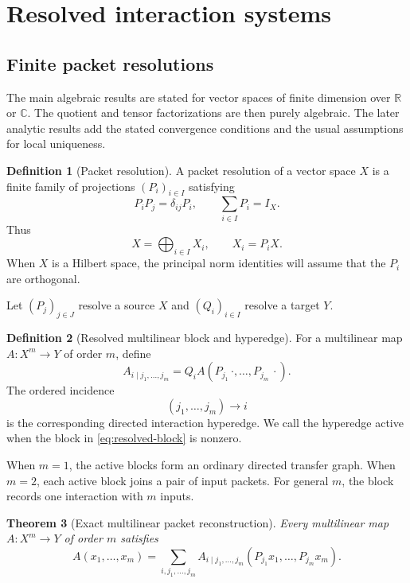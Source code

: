 \documentclass[11pt]{article}
\newtheorem{theorem}{Theorem}[section]
\theoremstyle{definition}
\newtheorem{definition}[theorem]{Definition}
\theoremstyle{remark}
\newcommand{\R}{\mathbb R}
\newcommand{\C}{\mathbb C}
\begin{document}
\section{Resolved interaction systems}\label{sec:resolved}

\subsection{Finite packet resolutions}
The main algebraic results are stated for vector spaces of finite dimension over $\R$ or $\C$.  The quotient and tensor factorizations are then purely algebraic.  The later analytic results add the stated convergence conditions and the usual assumptions for local uniqueness.

\begin{definition}[Packet resolution]\label{def:packet-resolution}
A packet resolution of a vector space $X$ is a finite family of projections $(P_i)_{i\in I}$ satisfying
\[
  P_iP_j=\delta_{ij}P_i,
  \qquad
  \sum_{i\in I}P_i=I_X.
\]
Thus
\[
  X=\bigoplus_{i\in I}X_i,
  \qquad X_i=P_iX.
\]
When $X$ is a Hilbert space, the principal norm identities will assume that the $P_i$ are orthogonal.
\end{definition}

Let $(P_j)_{j\in J}$ resolve a source $X$ and $(Q_i)_{i\in I}$ resolve a target $Y$.

\begin{definition}[Resolved multilinear block and hyperedge]\label{def:resolved-block}
For a multilinear map $A:X^m\to Y$ of order $m$, define
\begin{equation}\label{eq:resolved-block}
  A_{i\mid j_1,\ldots,j_m}
  =
  Q_iA(P_{j_1}\,\cdot,\ldots,P_{j_m}\,\cdot).
\end{equation}
The ordered incidence
\[
  (j_1,\ldots,j_m)\longrightarrow i
\]
is the corresponding directed interaction hyperedge.  We call the hyperedge active when the block in \eqref{eq:resolved-block} is nonzero.
\end{definition}

When $m=1$, the active blocks form an ordinary directed transfer graph.  When $m=2$, each active block joins a pair of input packets.  For general $m$, the block records one interaction with $m$ inputs.

\begin{theorem}[Exact multilinear packet reconstruction]\label{thm:packet-reconstruction}
Every multilinear map $A:X^m\to Y$ of order $m$ satisfies
\begin{equation}\label{eq:packet-reconstruction}
  A(x_1,\ldots,x_m)
  =
  \sum_{i,j_1,\ldots,j_m}
  A_{i\mid j_1,\ldots,j_m}
  (P_{j_1}x_1,\ldots,P_{j_m}x_m).
\end{equation}
\end{theorem}
\end{document}
